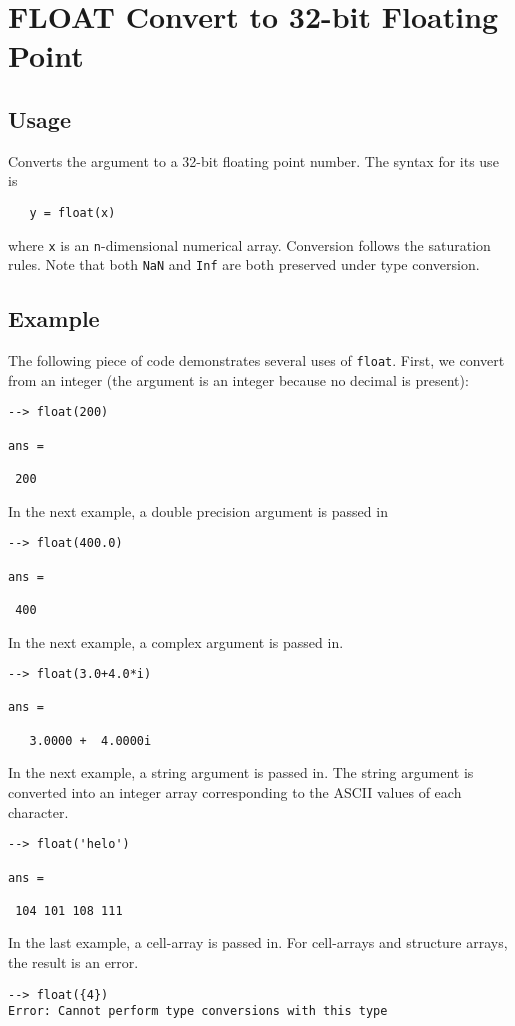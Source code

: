 \section{FLOAT Convert to 32-bit Floating Point}

\subsection{Usage}

Converts the argument to a 32-bit floating point number.  The syntax
for its use is
\begin{verbatim}
   y = float(x)
\end{verbatim}
where \verb|x| is an \verb|n|-dimensional numerical array.  
Conversion follows the saturation rules.  Note that both 
\verb|NaN| and \verb|Inf| are both preserved under type conversion.
\subsection{Example}

The following piece of code demonstrates several uses of \verb|float|. 
First, we convert from an integer (the argument is an integer 
because no decimal is present):
\begin{verbatim}
--> float(200)

ans = 

 200 
\end{verbatim}
In the next example, a double precision argument is passed 
in
\begin{verbatim}
--> float(400.0)

ans = 

 400 
\end{verbatim}
In the next example, a complex argument is passed in.
\begin{verbatim}
--> float(3.0+4.0*i)

ans = 

   3.0000 +  4.0000i 
\end{verbatim}
In the next example, a string argument is passed in.  The string 
argument is converted into an integer array corresponding to the 
ASCII values of each character.
\begin{verbatim}
--> float('helo')

ans = 

 104 101 108 111 
\end{verbatim}
In the last example, a cell-array is passed in.  For cell-arrays 
and structure arrays, the result is an error.
\begin{verbatim}
--> float({4})
Error: Cannot perform type conversions with this type
\end{verbatim}
